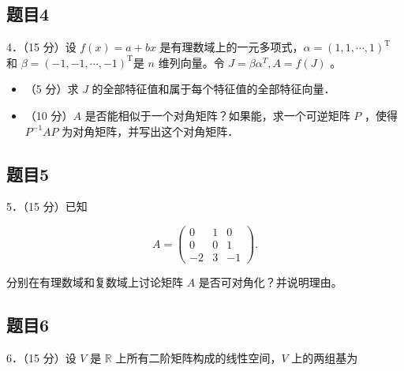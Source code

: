 \documentclass{article}
\begin{document}
\subsection{题目4}
4．（15 分）设 \(f(x)=a+b x\) 是有理数域上的一元多项式，\(\alpha=(1,1, \cdots, 1)^{\mathrm{T}}\) 和 \(\beta=(-1,-1, \cdots,-1)^{\mathrm{T}}\)是 \(n\) 维列向量。令 \(J=\beta \alpha^{T}, A=f(J)\) 。

\begin{itemize}
  \item[（1）] （5 分）求 \(J\) 的全部特征值和属于每个特征值的全部特征向量．
  \item[（2）] （10 分）\(A\) 是否能相似于一个对角矩阵？如果能，求一个可逆矩阵 \(P\) ，使得 \(P^{-1} A P\) 为对角矩阵，并写出这个对角矩阵．
\end{itemize}

\subsection{题目5}
5．（15 分）已知

\[
A=\left(\begin{array}{ccc}
0 & 1 & 0 \\
0 & 0 & 1 \\
-2 & 3 & -1
\end{array}\right) .
\]

分别在有理数域和复数域上讨论矩阵 \(A\) 是否可对角化？并说明理由。

\subsection{题目6}
6．（15 分）设 \(V\) 是 \(\mathbb{R}\) 上所有二阶矩阵构成的线性空间，\(V\) 上的两组基为
\end{document}
